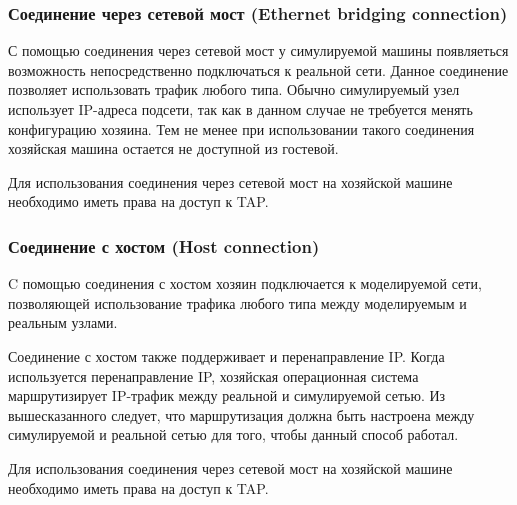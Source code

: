 \subsubsection{Соединение через сетевой мост (\abbr Ethernet bridging connection)}

С помощью соединения через сетевой мост у симулируемой машины появляеться возможность непосредственно подключаться к реальной сети. Данное соединение позволяет использовать трафик любого типа. Обычно симулируемый узел использует IP-адреса подсети, так как в данном случае не требуется менять конфигурацию хозяина. Тем не менее при использовании такого соединения хозяйская машина остается не доступной из гостевой.

Для использования соединения через сетевой мост на хозяйской машине необходимо иметь права на доступ к TAP.

\subsubsection{Соединение с хостом (\abbr Host connection)}

C помощью соединения с хостом хозяин подключается к моделируемой сети, позволяющей использование трафика любого типа между моделируемым и реальным узлами.

Соединение с хостом также поддерживает и перенаправление IP. Когда используется перенаправление IP, хозяйская операционная система маршрутизирует IP-трафик между реальной и симулируемой сетью. Из вышесказанного следует, что маршрутизация должна быть настроена между симулируемой и реальной сетью для того, чтобы данный способ работал.

Для использования соединения через сетевой мост на хозяйской машине необходимо иметь права на доступ к TAP.

